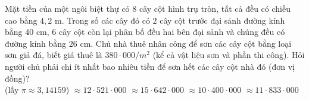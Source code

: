 \begin{ex}%
	Mặt tiền của một ngôi biệt thự có $8$ cây cột hình trụ tròn, tất cả đều có chiều cao bằng $4,2$ m. Trong số các cây đó có $2$ cây cột trước đại sảnh đường kính bằng $40$ cm, $6$ cây cột còn lại phân bố đều hai bên đại sảnh và chúng đều có đường kính bằng $26$ cm. Chủ nhà thuê nhân công để sơn các cây cột bằng loại sơn giả đá, biết giá thuê là $380\cdot 000/m^2$ (kể cả vật liệu sơn và phần thi công). Hỏi người chủ phải chi ít nhất bao nhiêu tiền để sơn hết các cây cột nhà đó (đơn vị đồng)?\\
	(lấy $\pi\approx 3,14159$)
	\choice
	{$\approx 12\cdot 521\cdot 000$}
	{$\approx 15\cdot 642\cdot 000$}
	{$\approx 10\cdot 400\cdot 000$}
	{\True $\approx 11\cdot 833\cdot 000$}
\end{ex}
